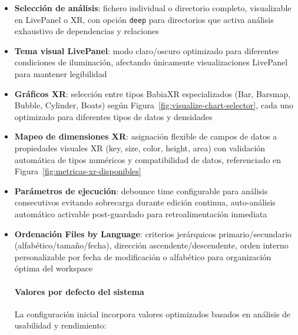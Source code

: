 \documentclass[a4paper, 12pt]{book}
\begin{document}
\begin{itemize}
  \item \textbf{Selección de análisis}: fichero individual o directorio completo, visualizable en LivePanel o XR, con opción \texttt{deep} para directorios que activa análisis exhaustivo de dependencias y relaciones
  \item \textbf{Tema visual LivePanel}: modo claro/oscuro optimizado para diferentes condiciones de iluminación, afectando únicamente visualizaciones LivePanel para mantener legibilidad
  \item \textbf{Gráficos XR}: selección entre tipos BabiaXR especializados (Bar, Barsmap, Bubble, Cylinder, Boats) según Figura~\ref{fig:visualize-chart-selector}, cada uno optimizado para diferentes tipos de datos y densidades
  \item \textbf{Mapeo de dimensiones XR}: asignación flexible de campos de datos a propiedades visuales XR (key, size, color, height, area) con validación automática de tipos numéricos y compatibilidad de datos, referenciado en Figura~\ref{fig:metricas-xr-disponibles}
  \item \textbf{Parámetros de ejecución}: debounce time configurable para análisis consecutivos evitando sobrecarga durante edición continua, auto-análisis automático activable post-guardado para retroalimentación inmediata
  \item \textbf{Ordenación Files by Language}: criterios jerárquicos primario/secundario (alfabético/tamaño/fecha), dirección ascendente/descendente, orden interno personalizable por fecha de modificación o alfabético para organización óptima del workspace

\paragraph{Valores por defecto del sistema}
La configuración inicial incorpora valores optimizados basados en análisis de usabilidad y rendimiento:


\end{itemize}
\end{document}
